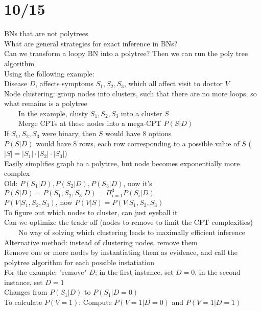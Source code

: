 \documentclass[10pt,letterpaper,unboxed,cm]{article}
\newcommand{\tab}{~~~~}
\begin{document}
\section{10/15}
BNs that are not polytrees\\
What are general strategies for exact inference in BNs?\\
Can we transform a loopy BN into a polytree? Then we can run the poly tree algorithm\\
Using the following example: \\
Disease $D$, affects symptoms $S_1, S_2, S_3$, which all affect visit to doctor $V$\\
Node clustering: group nodes into clusters, such that there are no more loops, so what remains is a polytree\\
\tab In the example, clusty $S_1, S_2, S_3$ into a cluster $S$\\
\tab Merge CPTs at these nodes into a mega-CPT $P(S|D)$\\
If $S_1, S_2, S_3$ were binary, then $S$ would have 8 options\\
$P(S|D)$ would have 8 rows, each row corresponding to a possible value of $S$ ($|S| = |S_1| \cdot |S_2| \cdot |S_3|$)\\
Easily simplifies graph to a polytree, but node becomes exponentially more complex\\
Old: $P(S_1|D), P(S_2|D), P(S_3|D)$, now it's $P(S|D) = P(S_1, S_2, S_3|D) = \Pi^3_{i=1} P(S_i|D)$\\
$P(V|S_1, S_2, S_3)$, now $P(V|S) = P(V|S_1, S_2, S_3)$\\
To figure out which nodes to cluster, can just eyeball it\\
Can we optimize the trade off (nodes to remove to limit the CPT complexities)\\
\tab No way of solving which clustering leads to maximally efficient inference\\
Alternative method: instead of clustering nodes, remove them\\
Remove one or more nodes by instantiating them as evidence, and call the polytree algorithm for each possible instatiation\\
For the example: "remove" $D$; in the first instance, set $D = 0$, in the second instance, set $D = 1$\\
Changes from $P(S_1|D)$ to $P(S_1|D = 0)$\\
To calculate $P(V = 1)$: Compute $P(V = 1|D = 0)$ and $P(V = 1|D = 1)$\\
\end{document}
